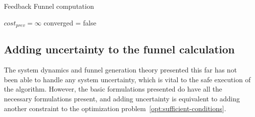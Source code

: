 \begin{algorithm}[H]
  \caption{Feedback Funnel computation}
  \label{alg:funnelalgorithm-extended}
  \DontPrintSemicolon \SetAlgoNoLine

   

  \(cost_{prev} = \infty\)\; converged = false \; \;
\end{algorithm}


\subsection{Adding uncertainty to the funnel calculation}
\label{sec:adding-uncertainty}

The system dynamics and funnel generation theory presented this far has not been
able to handle any system uncertainty, which is vital to the safe execution of
the \rrtfunnel{} algorithm. However, the basic formulations presented do have
all the necessary formulations present, and adding uncertainty is equivalent to
adding another constraint to the optimization
problem~\eqref{opt:sufficient-conditions}.

